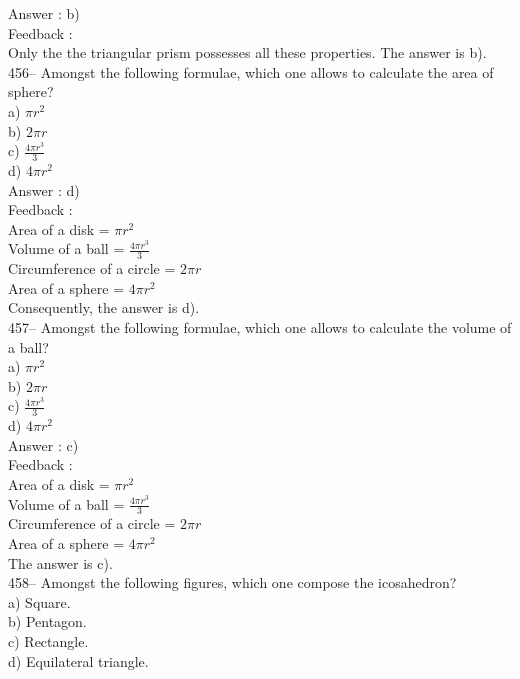 ﻿\documentclass[letterpaper, 12pt]{article}
\begin{document}
Answer : b)\\

Feedback :\\
Only the the triangular prism possesses all these properties. The answer is b).\\

456-- Amongst the following formulae, which one allows to calculate the area of sphere?\\
a) $\pi r^{2}$\\
b) $2\pi r$\\
c) $\frac{4\pi r^{3}}{3}$\\
d) $4\pi r^{2}$\\

Answer : d)\\

Feedback : \\
Area of a disk =  $\pi r^{2}$\\[2mm]
Volume of a ball = $\frac{4\pi r^{3}}{3}$\\[2mm]
Circumference of a circle = $2\pi r$\\[2mm]
Area of a sphere = $4\pi r^{2}$\\[2mm]
Consequently, the answer is d).\\

457-- Amongst the following formulae, which one allows to calculate the volume of a ball?\\
a) $\pi r^{2}$\\
b) $2\pi r$\\
c) $\frac{4\pi r^{3}}{3}$\\
d) $4\pi r^{2}$\\

Answer : c)\\

Feedback : \\
Area of a disk =  $\pi r^{2}$\\[2mm]
Volume of a ball = $\frac{4\pi r^{3}}{3}$\\[2mm]
Circumference of a circle = $2\pi r$\\[2mm]
Area of a sphere = $4\pi r^{2}$\\[2mm]
The answer is c).\\

458-- Amongst the following figures, which one compose the icosahedron?\\
a) Square.\\
b) Pentagon.\\
c) Rectangle.\\
d) Equilateral triangle.\\
\end{document}
